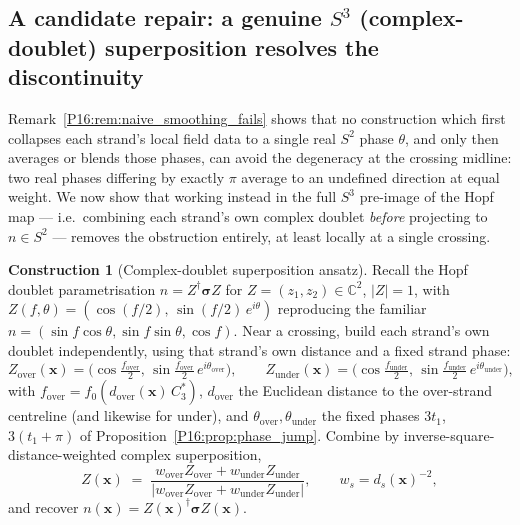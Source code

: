 \documentclass[11pt,a4paper]{article}
\theoremstyle{definition}\newtheorem{definition}[theorem]{Definition}
\theoremstyle{remark}
\theoremstyle{definition}\newtheorem{construction}[theorem]{Construction}
\begin{document}
\subsection{A candidate repair: a genuine $S^3$ (complex-doublet)
  superposition resolves the discontinuity}
\label{P16:sec:s3_repair}

Remark~\ref{P16:rem:naive_smoothing_fails} shows that no construction
which first collapses each strand's local field data to a single
real $S^2$ phase $\theta$, and only then averages or blends those
phases, can avoid the degeneracy at the crossing midline: two
real phases differing by exactly $\pi$ average to an undefined
direction at equal weight. We now show that working instead in the
full $S^3$ pre-image of the Hopf map --- i.e.\ combining each
strand's own complex doublet \emph{before} projecting to $n\in S^2$
--- removes the obstruction entirely, at least locally at a single
crossing.

\begin{construction}[Complex-doublet superposition ansatz]
\label{P16:constr:s3lift}
Recall the Hopf doublet parametrisation $n=Z^\dagger\boldsymbol\sigma Z$
for $Z=(z_1,z_2)\in\mathbb{C}^2$, $|Z|=1$, with
$Z(f,\theta)=(\cos(f/2),\,\sin(f/2)\,e^{i\theta})$ reproducing the
familiar $n=(\sin f\cos\theta,\sin f\sin\theta,\cos f)$. Near a
crossing, build each strand's own doublet independently, using that
strand's own distance and a fixed strand phase:
\begin{equation}
  Z_{\mathrm{over}}(\mathbf{x}) = \bigl(\cos\tfrac{f_{\mathrm{over}}}2,\,
    \sin\tfrac{f_{\mathrm{over}}}2\,e^{i\theta_{\mathrm{over}}}\bigr),
  \qquad
  Z_{\mathrm{under}}(\mathbf{x}) = \bigl(\cos\tfrac{f_{\mathrm{under}}}2,\,
    \sin\tfrac{f_{\mathrm{under}}}2\,e^{i\theta_{\mathrm{under}}}\bigr),
  \label{P16:eq:s3_doublets}
\end{equation}
with $f_{\mathrm{over}}=f_0(d_{\mathrm{over}}(\mathbf{x})\,C_3^*)$,
$d_{\mathrm{over}}$ the Euclidean distance to the over-strand
centreline (and likewise for under), and
$\theta_{\mathrm{over}},\theta_{\mathrm{under}}$ the fixed phases
$3t_1$, $3(t_1+\pi)$ of Proposition~\ref{P16:prop:phase_jump}. Combine by
inverse-square-distance-weighted complex superposition,
\begin{equation}
  Z(\mathbf{x}) \;=\;
  \frac{w_{\mathrm{over}}Z_{\mathrm{over}} + w_{\mathrm{under}}Z_{\mathrm{under}}}
       {\bigl|w_{\mathrm{over}}Z_{\mathrm{over}} + w_{\mathrm{under}}Z_{\mathrm{under}}\bigr|},
  \qquad w_s = d_s(\mathbf{x})^{-2},
  \label{P16:eq:s3_blend}
\end{equation}
and recover $n(\mathbf{x}) = Z(\mathbf{x})^\dagger\boldsymbol\sigma Z(\mathbf{x})$.
\end{construction}
\end{document}
